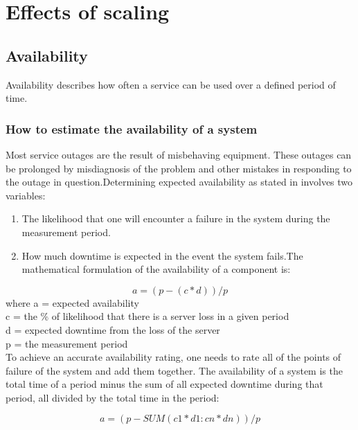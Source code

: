 \chapter{Effects of scaling}
\label{ch:Effects of scaling}

\section{Availability}
Availability describes how often a service can be used over a defined period of time.

\subsection{How to estimate the availability of a system}

Most service outages are the result of misbehaving equipment. These outages can be prolonged by misdiagnosis of the problem and other mistakes in responding to the outage in question.Determining expected availability as stated in \cite{reese_cloud_nodate} involves two variables:

\begin{enumerate}


	\item  The likelihood that one will encounter a failure in the system during the measurement period.

	\item  How much downtime is expected in the event the system fails.The mathematical formulation of the availability of a component is: 
\end{enumerate}
\begin{equation}
a = (p - (c*d))/p
\end{equation}
where a = expected availability\\
c = the \% of likelihood that there is a server loss in a given period\\
d = expected downtime from the loss of the server\\
p = the measurement period\\

To achieve an accurate availability rating, one needs to rate all of the points of failure of the system and add them together. The availability of a system is the total time of a period minus the sum of all expected downtime during that period, all divided by the total time in the period:

\begin{equation}
a = (p - SUM(c1*d1:cn*dn))/p
\end{equation}

